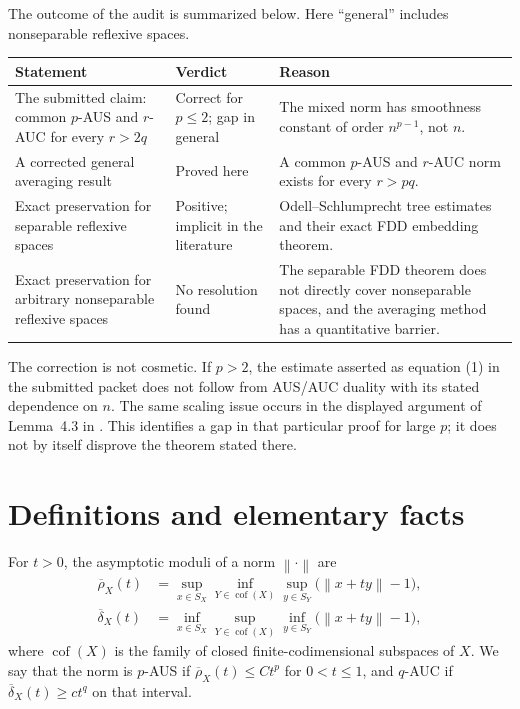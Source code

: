 \documentclass[11pt]{article}
\theoremstyle{definition}
\theoremstyle{remark}
\newcommand{\cof}{\operatorname{cof}}
\newcommand{\norm}[1]{\left\lVert #1\right\rVert}
\newcommand{\rhobar}{\overline\rho}
\newcommand{\deltabar}{\overline\delta}
\begin{document}
The outcome of the audit is summarized below.  Here ``general'' includes
nonseparable reflexive spaces.

\begin{center}
\renewcommand{\arraystretch}{1.25}
\begin{tabularx}{\textwidth}{@{}>{\raggedright\arraybackslash}p{}
>{\raggedright\arraybackslash}p{}X@{}}
\toprule
Statement & Verdict & Reason \\
\midrule
The submitted claim: common \(p\)-AUS and \(r\)-AUC for every \(r>2q\)
& Correct for \(p\le2\); gap in general
& The mixed norm has smoothness constant of order \(n^{p-1}\), not \(n\). \\
A corrected general averaging result
& Proved here
& A common \(p\)-AUS and \(r\)-AUC norm exists for every \(r>pq\). \\
Exact preservation for separable reflexive spaces
& Positive; implicit in the literature
& Odell--Schlumprecht tree estimates and their exact FDD embedding theorem. \\
Exact preservation for arbitrary nonseparable reflexive spaces
& No resolution found
& The separable FDD theorem does not directly cover nonseparable spaces, and the averaging method has a quantitative barrier. \\
\bottomrule
\end{tabularx}
\end{center}

The correction is not cosmetic.  If \(p>2\), the estimate asserted as equation
(1) in the submitted packet does not follow from AUS/AUC duality with its
stated dependence on \(n\).  The same scaling issue occurs in the displayed
argument of Lemma~4.3 in \cite{DKLR}.  This identifies a gap in that particular
proof for large \(p\); it does not by itself disprove the theorem stated there.

\section{Definitions and elementary facts}

For \(t>0\), the asymptotic moduli of a norm \(\norm{\cdot}\) are
\begin{align*}
\rhobar_X(t)
&=\sup_{x\in S_X}\inf_{Y\in\cof(X)}\sup_{y\in S_Y}
   \bigl(\norm{x+ty}-1\bigr),\\
\deltabar_X(t)
&=\inf_{x\in S_X}\sup_{Y\in\cof(X)}\inf_{y\in S_Y}
   \bigl(\norm{x+ty}-1\bigr),
\end{align*}
where \(\cof(X)\) is the family of closed finite-codimensional subspaces of
\(X\).  We say that the norm is \(p\)-AUS if
\(\rhobar_X(t)\le C t^p\) for \(0<t\le1\), and \(q\)-AUC if
\(\deltabar_X(t)\ge c t^q\) on that interval.
\end{document}
